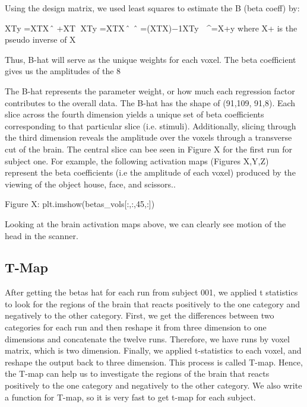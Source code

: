 \documentclass[11pt]{article}
\begin{document}
Using the design matrix, we used least squares to estimate the B (beta coeff) by:


                                                          
                 XTy⃗ =XTXβ⃗ ̂ +XTε⃗     
             XTy⃗ =XTXβ⃗ ̂ 
             β⃗ ̂ =(XTX)−1XTy⃗ 
                                                       β⃗ ^=X+y       where X+ is the pseudo inverse of X     

Thus, B-hat will serve as the unique weights for each voxel. The beta coefficient gives us the amplitudes of the 8

The B-hat represents the parameter weight, or how much each regression factor contributes to the overall data. The B-hat has the shape of (91,109, 91,8). Each slice across the fourth dimension yields a unique set of beta coefficients corresponding to that particular slice (i.e. stimuli). Additionally, slicing through the third dimension reveals the amplitude over the voxels through a transverse cut of the brain. The central slice can bee seen in Figure X for the first run for subject one.
For example, the following activation maps (Figures X,Y,Z) represent the beta coefficients (i.e the amplitude of each voxel) produced by the viewing of the object house, face, and scissors..

        Figure X:  plt.imshow(betas_vols[:,:,45,:])


Looking at the brain activation maps above, we can clearly see motion of the head in the scanner. 

\subsection{T-Map}
After getting the betas hat for each run from subject 001, we applied t statistics to look for the regions of the brain that reacts positively to the one category and negatively to the other category. First, we get the differences between two categories for each run and then reshape it from three dimension to one dimensions and concatenate the twelve runs. Therefore, we have runs by voxel matrix, which is two dimension.  Finally, we applied t-statistics to each voxel, and reshape the output back to three dimension. This process is called T-map.  Hence, the T-map can help us to investigate the regions of the brain that reacts positively to the one category and negatively to the other category. We also write a function for T-map, so it is very fast to get t-map for  each subject.
\end{document}
